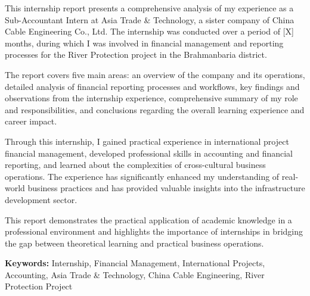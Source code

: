\vspace{2cm}
\begin{minipage}{0.9\textwidth}
    \large
    This internship report presents a comprehensive analysis of my experience as a Sub-Accountant Intern at Asia Trade \& Technology, a sister company of China Cable Engineering Co., Ltd. The internship was conducted over a period of [X] months, during which I was involved in financial management and reporting processes for the River Protection project in the Brahmanbaria district.
    
    \vspace{1cm}
    The report covers five main areas: an overview of the company and its operations, detailed analysis of financial reporting processes and workflows, key findings and observations from the internship experience, comprehensive summary of my role and responsibilities, and conclusions regarding the overall learning experience and career impact.
    
    \vspace{1cm}
    Through this internship, I gained practical experience in international project financial management, developed professional skills in accounting and financial reporting, and learned about the complexities of cross-cultural business operations. The experience has significantly enhanced my understanding of real-world business practices and has provided valuable insights into the infrastructure development sector.
    
    \vspace{1cm}
    This report demonstrates the practical application of academic knowledge in a professional environment and highlights the importance of internships in bridging the gap between theoretical learning and practical business operations.
    
    \vspace{1cm}
    \textbf{Keywords:} Internship, Financial Management, International Projects, Accounting, Asia Trade \& Technology, China Cable Engineering, River Protection Project
\end{minipage}
